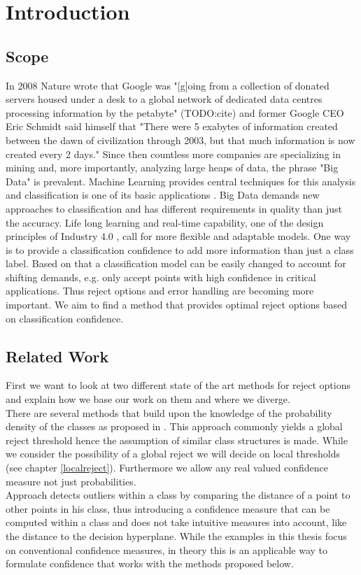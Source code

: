 %
\chapter{Introduction}
\label{sec:intro}

\section{Scope}
In 2008 Nature wrote that Google was "[g]oing from a collection of donated servers housed under a desk to a global network of dedicated data centres processing information by the petabyte" (TODO:cite) and former Google CEO Eric Schmidt said himself that "There were 5 exabytes of information created between the dawn of civilization through 2003, but that much information is now created every 2 days." Since then countless more companies are specializing in mining and, more importantly, analyzing large heaps of data, the phrase "Big Data" is prevalent. Machine Learning provides central techniques for this analysis and classification is one of its basic applications \cite[p. 5]{Alp:2010}. Big Data demands new approaches to classification and has different requirements in quality than just the accuracy. Life long learning \cite[p. 3]{Sut:2014} and real-time capability, one of the design principles of Industry 4.0 \cite[p. 12]{Her:2015}, call for more flexible and adaptable models. One way is to provide a classification confidence \cite{Del:2005} to add more information than just a class label. Based on that a classification model can be easily changed to account for shifting demands, e.g. only accept points with high confidence in critical applications. Thus reject options and error handling are becoming more important. We aim to find a method that provides optimal reject options based on classification confidence.

\section{Related Work}
First we want to look at two different state of the art methods for reject options and explain how we base our work on them and where we diverge. \\
There are several methods that build upon the knowledge of the probability density of the classes as proposed in \cite{Cho:1970}. This approach commonly yields a global reject threshold hence the assumption of similar class structures is made. While we consider the possibility of a global reject we will decide on local thresholds (see chapter \ref{localreject}). Furthermore we allow any real valued confidence measure not just probabilities. \\
Approach \cite{Sug:2013} detects outliers within a class by comparing the distance of a point to other points in his class, thus introducing a confidence measure that can be computed within a class and does not take intuitive measures into account, like the distance to the decision hyperplane. While the examples in this thesis focus on conventional confidence measures, in theory this is an applicable way to formulate confidence that works with the methods proposed below.

